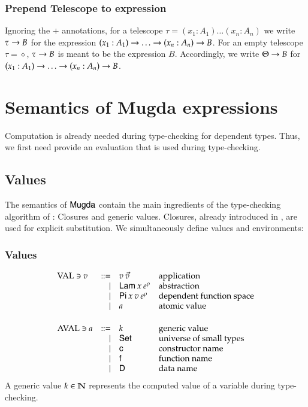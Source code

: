 \subsubsection{Prepend Telescope to expression}
Ignoring the $+$ annotations, for a telescope $\tau = (x_1 : A_1) \ldots (x_n : A_n)$ we write $\tau \rightarrow B$ for the expression $( x_1 : A_1 ) \rightarrow{\ldots \rightarrow( x_n : A_n ) \rightarrow{B}}$.
For an empty telescope $\tau = \diamond$, $\tau \rightarrow B$ is meant to be the expression $B$.
Accordingly, we write $\Theta \rightarrow B$ for $( x_1 : A_1 ) \rightarrow{\ldots \rightarrow( x_n : A_n ) \rightarrow{B}}$.


\section{Semantics of Mugda expressions}
Computation is already needed during type-checking for dependent types.
Thus, we first need provide an evaluation that is used during type-checking.

\subsection{Values}

The semantics of $\textsf{Mugda}$ contain the main ingredients of the type-checking algorithm of \cite{coquand96algorithm}: Closures and generic values.
Closures, already introduced in \cite{Landin63}, are used for explicit substitution.
We simultaneously define values and environments:

\subsubsection{Values}
\[
\begin{array}{lrll}
\Val \ni v & ::= & v \: \vec{v} & \mbox{application}\\
& \mid & \vlam \: x \: \cl{e}{\rho} & \mbox{abstraction}\\
& \mid & \vpi \: x \: v \: \cl{e}{\rho} & \mbox{dependent function space}\\
& \mid & a & \mbox{atomic value}\\
\vs\\
\AVal \ni a & ::= & k & \mbox{generic value}\\
& \mid & \Set & \mbox{universe of small types} \\
& \mid & \cc & \mbox{constructor name}\\
& \mid & \ff & \mbox{function name}\\
& \mid & \DD & \mbox{data name}\\
\end{array}
\]
A generic value $k \in \mathbb{N}$ represents the computed value of a variable during type-checking.

